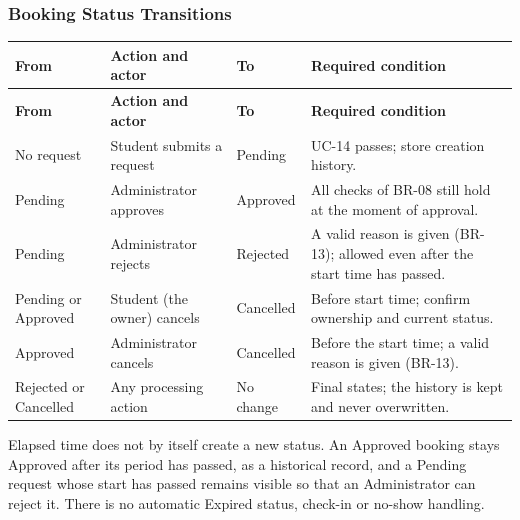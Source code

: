 \subsubsection{Booking Status Transitions}
\begingroup
\small
{}
\setlength{\tabcolsep}{3pt}
\renewcommand{\arraystretch}{1.12}
\begin{longtable}{|>{\raggedright\arraybackslash}p{}|>{\raggedright\arraybackslash}p{}|>{\raggedright\arraybackslash}p{}|>{\raggedright\arraybackslash}p{}|}
\hline
\textbf{From} & \textbf{Action and actor} & \textbf{To} & \textbf{Required condition} \\ \hline
\endfirsthead
\hline
\textbf{From} & \textbf{Action and actor} & \textbf{To} & \textbf{Required condition} \\ \hline
\endhead
\hline
\endfoot
\hline
\endlastfoot
No request & Student submits a request & Pending & UC-14 passes; store creation history. \\ \hline
Pending & Administrator approves & Approved & All checks of BR-08 still hold at the moment of approval. \\ \hline
Pending & Administrator rejects & Rejected & A valid reason is given (BR-13); allowed even after the start time has passed. \\ \hline
Pending or Approved & Student (the owner) cancels & Cancelled & Before start time; confirm ownership and current status. \\ \hline
Approved & Administrator cancels & Cancelled & Before the start time; a valid reason is given (BR-13). \\ \hline
Rejected or Cancelled & Any processing action & No change & Final states; the history is kept and never overwritten. \\ \hline
\end{longtable}
\endgroup

Elapsed time does not by itself create a new status. An Approved booking stays Approved after its period has passed, as a historical record, and a Pending request whose start has passed remains visible so that an Administrator can reject it. There is no automatic Expired status, check-in or no-show handling.

